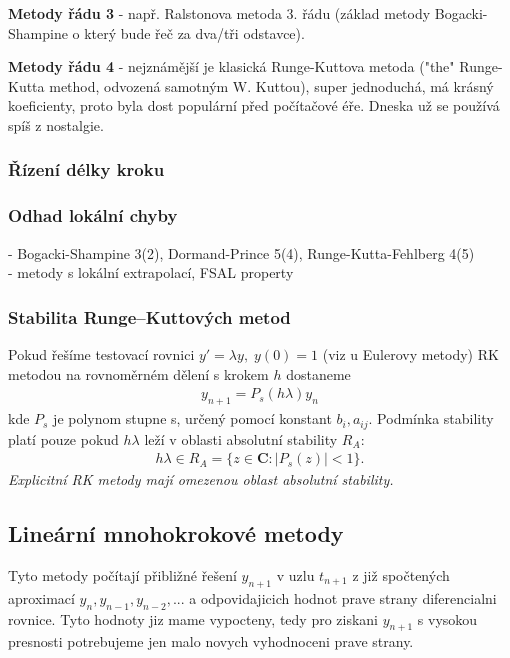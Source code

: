 \documentclass[a4]{report}
\theoremstyle{definition}
\begin{document}
{\textbf{Metody řádu 3} - např. Ralstonova metoda 3. řádu (základ metody Bogacki-Shampine o který bude řeč za dva/tři odstavce).

\textbf{Metody řádu 4} - nejznámější je klasická Runge-Kuttova metoda ("the" Runge-Kutta method, odvozená samotným W. Kuttou), super jednoduchá, má krásný koeficienty, proto byla dost populární před počítačové éře. Dneska už se používá spíš z nostalgie. 

\subsubsection*{Řízení délky kroku}

\subsubsection*{Odhad lokální chyby}
- Bogacki-Shampine 3(2), Dormand-Prince 5(4), Runge-Kutta-Fehlberg 4(5) \\
- metody s lokální extrapolací, FSAL property

\subsubsection*{Stabilita Runge--Kuttových metod}
Pokud řešíme testovací rovnici $y'=\lambda y,\; y(0)=1$ (viz u Eulerovy metody) RK metodou na rovnoměrném dělení s krokem $h$ dostaneme
\begin{align}
y_{n+1}=P_{s}(h \lambda) y_{n}
\end{align}
kde $P_{s}$ je polynom stupne s, určený pomocí konstant $b_{i}, a_{ij}$. Podmínka stability platí pouze pokud $h \lambda$ leží v oblasti absolutní stability $R_{A}$:
\begin{align}
h \lambda \in R_{A} = \lbrace z \in \mathbf{C} : \vert P_{s}(z) \vert < 1 \rbrace.
\end{align}
\textit{Explicitní RK metody mají omezenou oblast absolutní stability.} 

\subsection{Lineární mnohokrokové metody}
Tyto metody počítají přibližné řešení $y_{n+1}$ v uzlu $t_{n+1}$ z již spočtených aproximací $y_{n}, y_{n-1}, y_{n-2},...$ a odpovidajicich hodnot prave strany diferencialni rovnice. Tyto hodnoty jiz mame vypocteny, tedy pro ziskani $y_{n+1}$ s vysokou presnosti potrebujeme  jen malo novych vyhodnoceni prave strany. 

}
\end{document}
